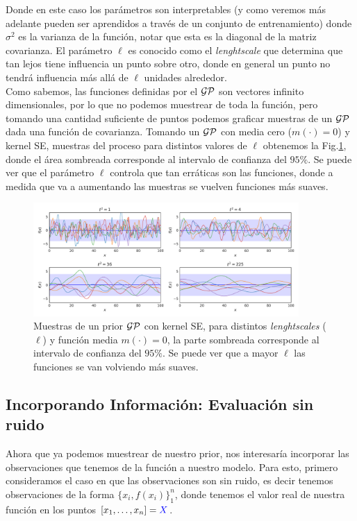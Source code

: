 Donde en este caso los parámetros son interpretables (y como veremos más adelante pueden ser aprendidos a través de un conjunto de entrenamiento) donde $\sigma^2$ es la varianza de la función, notar que esta es la diagonal de la matriz covarianza. El parámetro $\ell$ es conocido como el \textit{lenghtscale} que determina que tan lejos tiene influencia un punto sobre otro, donde en general un punto no tendrá influencia más allá de $\ell$ unidades alrededor.\\

Como sabemos, las funciones definidas por el $\mathcal{GP}$ son vectores infinito dimensionales, por lo que no podemos muestrear de toda la función, pero tomando una cantidad suficiente de puntos podemos graficar muestras de un $\mathcal{GP}$ dada una función de covarianza. Tomando un $\mathcal{GP}$ con media cero ($m(\cdot)=0$) y kernel SE, muestras del proceso para distintos valores de $\ell$ obtenemos la Fig.\ref{fig:gp_1}, donde el área sombreada corresponde al intervalo de confianza del $95\%$. Se puede ver que el parámetro $\ell$ controla que tan erráticas son las funciones, donde a medida que va a aumentando las muestras se vuelven funciones más suaves.

\begin{figure}[H]
	\centering
	\includegraphics[width=0.9\textwidth]{img/gp_prior_samples.pdf}
	\caption{Muestras de un prior $\mathcal{GP}$ con kernel SE, para distintos \textit{lenghtscales} ($\ell$) y función media $m(\cdot)=0$, la parte sombreada corresponde al intervalo de confianza del $95\%$. Se puede ver que a mayor $\ell$ las funciones se van volviendo más suaves.}
	\label{fig:gp_1}
\end{figure}

\subsection{Incorporando Información: Evaluación sin ruido}

Ahora que ya podemos muestrear de nuestro prior, nos interesaría incorporar las observaciones que tenemos de la función a nuestro modelo. Para esto, primero consideramos el caso en que las observaciones son sin ruido, es decir tenemos observaciones de la forma $\{x_i, f(x_i)\}_{1}^{n}$, donde tenemos el valor real de nuestra función en los puntos $[x_1, \ldots, x_n]=\textcolor{blue}{X}$. 

